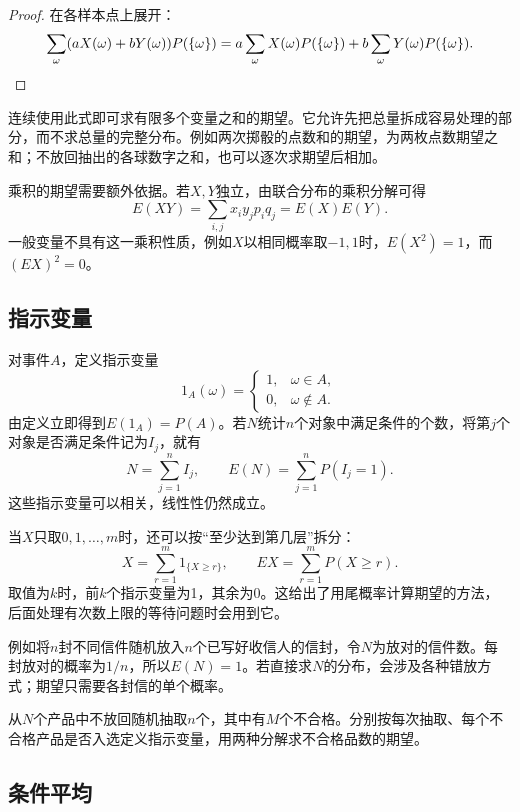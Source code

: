 \begin{proof}
在各样本点上展开：
\[
 \sum_\omega(aX(\omega)+bY(\omega))P(\{\omega\})
 =a\sum_\omega X(\omega)P(\{\omega\})
 +b\sum_\omega Y(\omega)P(\{\omega\}).\qedhere
\]
\end{proof}

连续使用此式即可求有限多个变量之和的期望。它允许先把总量拆成容易处理的部分，而不求总量的完整分布。例如两次掷骰的点数和的期望，为两枚点数期望之和；不放回抽出的各球数字之和，也可以逐次求期望后相加。

乘积的期望需要额外依据。若\(X,Y\)独立，由联合分布的乘积分解可得
\begin{equation}\label{eq:prob-independent-product}
 E(XY)=\sum_{i,j}x_iy_jp_iq_j=E(X)E(Y).
\end{equation}
一般变量不具有这一乘积性质，例如\(X\)以相同概率取\(-1,1\)时，\(E(X^2)=1\)，而\((EX)^2=0\)。

\subsection{指示变量}

对事件\(A\)，定义{\heiti 指示变量}
\[
 1_A(\omega)=\begin{cases}1,&\omega\in A,\\0,&\omega\notin A.\end{cases}
\]
由定义立即得到\(E(1_A)=P(A)\)。若\(N\)统计\(n\)个对象中满足条件的个数，将第\(j\)个对象是否满足条件记为\(I_j\)，就有
\begin{equation}\label{eq:prob-indicators}
 N=\sum_{j=1}^nI_j,\qquad E(N)=\sum_{j=1}^nP(I_j=1).
\end{equation}
这些指示变量可以相关，线性性仍然成立。

当\(X\)只取\(0,1,\ldots,m\)时，还可以按“至少达到第几层”拆分：
\[
 X=\sum_{r=1}^m1_{\{X\ge r\}},\qquad
 EX=\sum_{r=1}^mP(X\ge r).
\]
取值为\(k\)时，前\(k\)个指示变量为1，其余为0。这给出了用尾概率计算期望的方法，后面处理有次数上限的等待问题时会用到它。

例如将\(n\)封不同信件随机放入\(n\)个已写好收信人的信封，令\(N\)为放对的信件数。每封放对的概率为\(1/n\)，所以\(E(N)=1\)。若直接求\(N\)的分布，会涉及各种错放方式；期望只需要各封信的单个概率。

\begin{example}
从\(N\)个产品中不放回随机抽取\(n\)个，其中有\(M\)个不合格。分别按每次抽取、每个不合格产品是否入选定义指示变量，用两种分解求不合格品数的期望。
\end{example}

\subsection{条件平均}

